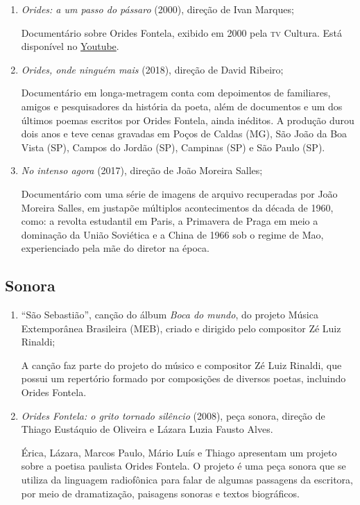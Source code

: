 \documentclass[12pt]{extarticle}
\begin{document}
\begin{enumerate}
\item
  \emph{Orides: a um passo do pássaro} (2000), direção de Ivan Marques;

  Documentário sobre Orides Fontela, exibido em 2000 pela \textsc{tv} Cultura. Está disponível no \href{https://www.youtube.com/watch?v=l9XbX8JTMXI}{Youtube}.

\item
  \emph{Orides, onde ninguém mais} (2018), direção de David Ribeiro;

  Documentário em longa-metragem conta com depoimentos de familiares, amigos e pesquisadores da história da poeta, além de documentos e um dos últimos poemas escritos por Orides Fontela, ainda inéditos. A produção durou dois anos e teve cenas gravadas em Poços de Caldas (MG), São João da Boa Vista (SP), Campos do Jordão (SP), Campinas (SP) e São Paulo (SP).

\item
  \emph{No intenso agora} (2017), direção de João Moreira Salles;

Documentário com uma série de imagens de arquivo recuperadas por João Moreira Salles, em justapõe múltiplos acontecimentos da década de 1960, como: a revolta estudantil em Paris, a Primavera de Praga em meio a dominação da União Soviética e a China de 1966 sob o regime de Mao, experienciado pela mãe do diretor na época. 

\end{enumerate}

\subsection{Sonora}

\begin{enumerate}
\item
  ``São Sebastião'', canção do álbum \emph{Boca do mundo}, do projeto Música
  Extemporânea Brasileira (MEB), criado e dirigido pelo compositor Zé
  Luiz Rinaldi;

 A canção faz parte do projeto do músico e compositor Zé Luiz Rinaldi, que possui um repertório formado por composições de diversos poetas, incluindo Orides Fontela.


\item
  \emph{Orides Fontela: o grito tornado silêncio} (2008), peça sonora,
  direção de Thiago Eustáquio de Oliveira e Lázara Luzia Fausto Alves.

Érica, Lázara, Marcos Paulo, Mário Luís e Thiago apresentam um projeto sobre a poetisa paulista Orides Fontela. O projeto é uma peça sonora que se utiliza da linguagem radiofônica para falar de algumas passagens da escritora, por meio de dramatização, paisagens sonoras e textos biográficos.

\end{enumerate}
\end{document}
